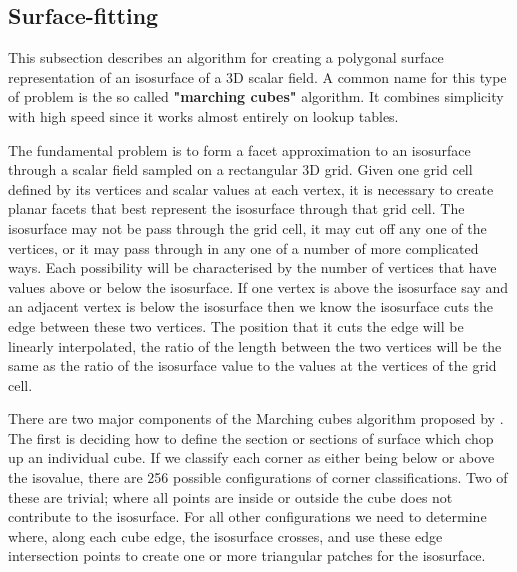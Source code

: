 \subsection{Surface-fitting}

This subsection describes an algorithm for creating a polygonal surface representation of an isosurface of a 3D scalar field. A common name for this type of problem is the so called \textbf{ "marching cubes" } algorithm. It combines simplicity with high speed since it works almost entirely on lookup tables.

The fundamental problem is to form a facet approximation to an isosurface through a scalar field sampled on a rectangular 3D grid. Given one grid cell defined by its vertices and scalar values at each vertex, it is necessary to create planar facets that best represent the isosurface through that grid cell. The isosurface may not be pass through the grid cell, it may cut off any one of the vertices, or it may pass through in any one of a number of more complicated ways. Each possibility will be characterised by the number of vertices that have values above or below the isosurface. If one vertex is above the isosurface say and an adjacent vertex is below the isosurface then we know the isosurface cuts the edge between these two vertices. The position that it cuts the edge will be linearly interpolated, the ratio of the length between the two vertices will be the same as the ratio of the isosurface value to the values at the vertices of the grid cell.


There are two major components of the Marching cubes algorithm proposed by \cite{Lorensen:1987:MCA}. The first is deciding how to define the section or sections of surface which chop up an individual cube. If we classify each corner as either being below or above the isovalue, there are 256 possible configurations of corner classifications. Two of these are trivial; where all points are inside or outside the cube does not contribute to the isosurface. For all other configurations we need to determine where, along each cube edge, the isosurface crosses, and use these edge intersection points to create one or more triangular patches for the isosurface.


